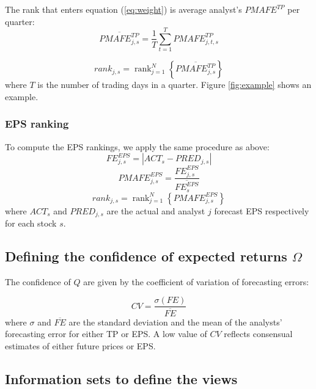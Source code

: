 \documentclass{article}
\DeclareMathOperator{\rank}{rank}
\begin{document}
The rank  that enters equation (\ref{eq:weight}) is average analyst's $PMAFE^{TP}$ per quarter:
\begin{equation}
\overline{PMAFE_{j,s}^{TP}}=\frac{1}{T} \sum_{t=1}^{T} PMAFE_{j,t,s}^{TP}
\end{equation}

\begin{equation}
\label{tp:rank}
rank_{j,s}=\rank_{j=1}^{N} \left\{ \overline{PMAFE_{j,s}^{TP}} \right\}
\end{equation}
where $T$ is the number of trading days in a quarter. Figure \ref{fig:example} shows an example.


\subsubsection{EPS ranking} 
To compute the EPS rankings, we apply the same procedure as above:
\begin{equation}
FE_{j,s}^{EPS}=|{ACT_{s}-PRED_{j,s}}|
\end{equation}
\begin{equation}
PMAFE_{j,s}^{EPS}= \frac{FE_{j,s}^{EPS}}{\overline{FE_{s}^{EPS}}}
\end{equation}
\begin{equation}
\label{eps:rank}
rank_{j,s}=\rank_{j=1}^{N} \left\{ PMAFE_{j,s}^{EPS} \right\} 
\end{equation}
where $ACT_{s}$ and $PRED_{j,s}$ are the actual and  analyst $j$ forecast EPS respectively for each stock $s$.


\subsection{Defining the confidence of expected returns $\Omega$}
\label{def-omega}
The confidence of $Q$ are given by the coefficient of variation of forecasting errors:

\begin{equation}
CV = \frac{\sigma (FE)}{\overline{FE}}
\end{equation}
where $\sigma$ and $\overline{FE}$ are the standard deviation and the mean of the analysts' forecasting error for either TP or EPS. A low value of $CV$ reflects consensual estimates of either future prices or EPS.



\subsection{Information sets to define the views}
\end{document}
